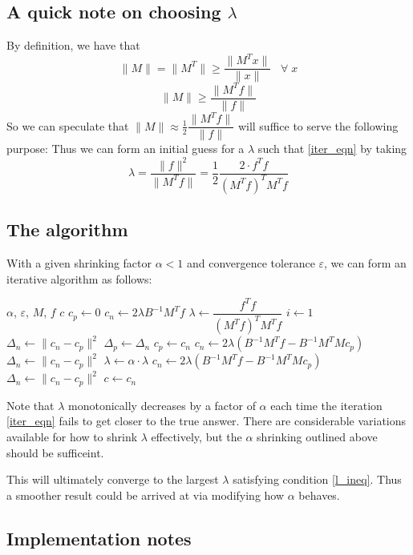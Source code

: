 \documentclass[12pt,a4paper]{article}
\newcommand{\eps}{\varepsilon}
\begin{document}
\subsection{A quick note on choosing $\lambda$}
By definition, we have that
\[
    \| M \| = \| M^T \| \ge \dfrac{\|M^Tx\|}{\|x\|} \;\;\; \forall \; x 
\]
\[
    \| M \| \ge \dfrac{\|M^Tf\|}{\|f\|}
\]
So we can speculate that $\|M\| \approx \frac{1}{2} \dfrac{\|M^Tf\|}{\|f\|}$ will
suffice to serve the following purpose: 
Thus we can form an initial guess for a $\lambda$ such that \ref{iter_eqn} by
taking
\[
    \lambda = \dfrac{\|f\|^2}{\|M^T f\|} = \dfrac{1}{2} \dfrac{2 \cdot f^T f}{(M^T f)^T M^T f}
\]

\newpage
\subsection{The algorithm}
With a given shrinking factor $\alpha < 1$ and convergence tolerance $\eps$,
we can form an iterative algorithm as follows:
\begin{algorithmic}
    \Require $\alpha$, $\eps$, $M$, $f$ 
    \Ensure $c$
    \State $c_p \gets 0$
    \State $c_n \gets 2 \lambda B^{-1} M^T f$
    \State $\lambda \gets \dfrac{f^T f}{(M^T f)^T M^T f}$
    \State $i \gets 1$
    \State $\Delta_n \gets \|c_n - c_p\|^2$
    \Repeat
        \State $\Delta_p \gets \Delta_n$
        \State $c_p \gets c_n$
        \State $c_n \gets 2\lambda \left( B^{-1} M^T f - B^{-1} M^T M c_p\right)$
        \State $\Delta_n \gets \|c_n - c_p\|^2$
            \State $\lambda \gets \alpha \cdot \lambda$
            \State $c_n \gets 2\lambda \left( B^{-1} M^T f - B^{-1} M^T M c_p\right)$
            \State $\Delta_n \gets \|c_n - c_p\|^2$
        \EndWhile
    \Until{$\Delta_n < \eps$}
    \State $c \gets c_n$
\end{algorithmic}
Note that $\lambda$ monotonically decreases by a factor of $\alpha$ each time
the iteration \ref{iter_eqn} fails to get closer to the true answer.
There are considerable variations available for how to shrink $\lambda$ effectively,
but the $\alpha$ shrinking outlined above should be sufficeint.

This will ultimately converge to the largest $\lambda$ satisfying condition \ref{l_ineq}.
Thus a smoother result could be arrived at via modifying how $\alpha$ behaves.

\newpage
\subsection{Implementation notes}
\end{document}
